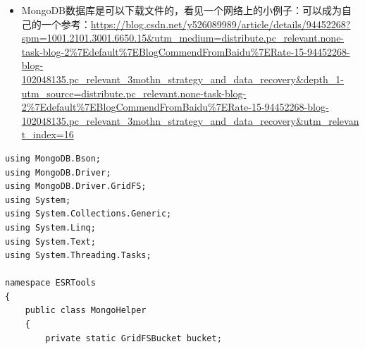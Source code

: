 \documentclass[9pt, b5paper]{article}
\begin{document}
\begin{itemize}
\begin{itemize}
\begin{itemize}
\begin{itemize}
\item MongoDB数据库是可以下载文件的，看见一个网络上的小例子：可以成为自己的一个参考：\url{https://blog.csdn.net/y526089989/article/details/94452268?spm=1001.2101.3001.6650.15&utm_medium=distribute.pc_relevant.none-task-blog-2\%7Edefault\%7EBlogCommendFromBaidu\%7ERate-15-94452268-blog-102048135.pc_relevant_3mothn_strategy_and_data_recovery&depth_1-utm_source=distribute.pc_relevant.none-task-blog-2\%7Edefault\%7EBlogCommendFromBaidu\%7ERate-15-94452268-blog-102048135.pc_relevant_3mothn_strategy_and_data_recovery&utm_relevant_index=16}
\end{itemize}
\begin{verbatim}
using MongoDB.Bson;
using MongoDB.Driver;
using MongoDB.Driver.GridFS;
using System;
using System.Collections.Generic;
using System.Linq;
using System.Text;
using System.Threading.Tasks;
 
namespace ESRTools
{
    public class MongoHelper
    {
        private static GridFSBucket bucket;
 

\end{verbatim}
\end{itemize}
\end{itemize}
\end{itemize}
\end{document}
